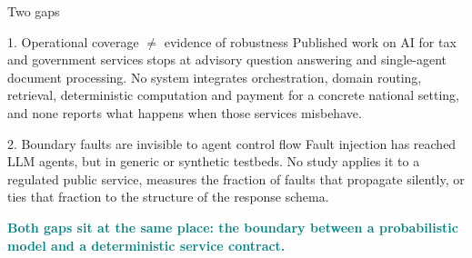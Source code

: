 \documentclass[aspectratio=169,10pt]{beamer}
\newcommand{\hl}[1]{\textcolor{teal}{\textbf{#1}}}      %
\begin{document}
\begin{frame}{Two gaps}
  \begin{block}{1. Operational coverage $\neq$ evidence of robustness}
    Published work on AI for tax and government services stops at advisory question answering
    and single-agent document processing. No system integrates orchestration, domain routing,
    retrieval, deterministic computation and payment for a concrete national setting, and none
    reports what happens when those services misbehave.
  \end{block}
  \begin{block}{2. Boundary faults are invisible to agent control flow}
    Fault injection has reached LLM agents, but in generic or synthetic testbeds. No study
    applies it to a regulated public service, measures the fraction of faults that propagate
    silently, or ties that fraction to the structure of the response schema.
  \end{block}
  \vfill
  \centering
  \hl{Both gaps sit at the same place: the boundary between a probabilistic model and a
  deterministic service contract.}
\end{frame}
\end{document}
